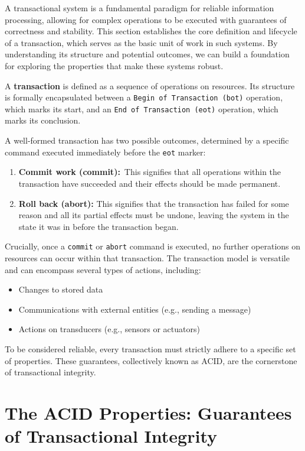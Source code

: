 \documentclass{scrbook}
\begin{document}
A transactional system is a fundamental paradigm for reliable
information processing, allowing for complex operations to be executed
with guarantees of correctness and stability. This section establishes
the core definition and lifecycle of a transaction, which serves as the
basic unit of work in such systems. By understanding its structure and
potential outcomes, we can build a foundation for exploring the
properties that make these systems robust.

A \textbf{transaction} is defined as a sequence of operations on resources. Its structure is formally encapsulated between
a \texttt{Begin\ of\ Transaction\ (bot)} operation, which marks its start, and an \texttt{End\ of\ Transaction\ (eot)} operation, which marks its conclusion.

A well-formed transaction has two possible outcomes, determined by a
specific command executed immediately before the \texttt{eot} marker:

\begin{enumerate}
    \item 
    \textbf{Commit work (commit):}~This signifies that all operations within the transaction have succeeded and their effects should be made permanent.

    \item 
    \textbf{Roll back (abort):} This signifies that the transaction has failed for some reason and all its partial effects must be undone, leaving the system in the state it was in before the transaction began.
\end{enumerate}

Crucially, once a \texttt{commit} or \texttt{abort} command is executed,
no further operations on resources can occur within that transaction. The transaction model is versatile and can encompass several types of
actions, including:

\begin{itemize}
\item
  Changes to stored data
\item
  Communications with external entities (e.g., sending a message)
\item 
Actions on transducers (e.g., sensors or actuators)
\end{itemize}

To be considered reliable, every transaction must strictly adhere to a
specific set of properties. These guarantees, collectively known as
ACID, are the cornerstone of transactional integrity.

\section{The ACID Properties: Guarantees of Transactional Integrity}
\end{document}
